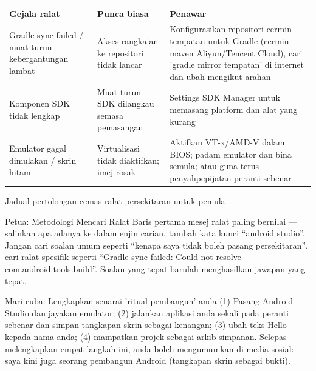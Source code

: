 \begin{center}
\begin{tabularx}{\linewidth}{|X|X|X|}
\hline
\textbf{Gejala ralat} & \textbf{Punca biasa} & \textbf{Penawar} \tabularnewline
\hline
Gradle sync failed / muat turun kebergantungan lambat & Akses rangkaian ke repositori tidak lancar & Konfigurasikan repositori cermin tempatan untuk Gradle (cermin maven Aliyun/Tencent Cloud), cari 'gradle mirror tempatan' di internet dan ubah mengikut arahan \tabularnewline
Komponen SDK tidak lengkap & Muat turun SDK dilangkau semasa pemasangan & Settings SDK Manager untuk memasang platform dan alat yang kurang \tabularnewline
Emulator gagal dimulakan / skrin hitam & Virtualisasi tidak diaktifkan; imej rosak & Aktifkan VT-x/AMD-V dalam BIOS; padam emulator dan bina semula; atau guna terus penyahpepijatan peranti sebenar \tabularnewline
\hline
\end{tabularx}
\end{center}

\begin{center}\small\color{gray}Jadual pertolongan cemas ralat persekitaran untuk pemula\end{center}

\begin{tcbinfo}{Petua: Metodologi Mencari Ralat}
Baris pertama mesej ralat paling bernilai — salinkan apa adanya ke dalam enjin carian, tambah kata kunci “android studio”. Jangan cari soalan umum seperti “kenapa saya tidak boleh pasang persekitaran”, cari ralat spesifik seperti “Gradle sync failed: Could not resolve com.android.tools.build”. Soalan yang tepat barulah menghasilkan jawapan yang tepat.

\end{tcbinfo}

\begin{tcbpractice}{Mari cuba: Lengkapkan senarai 'ritual pembangun' anda}
(1) Pasang Android Studio dan jayakan emulator; (2) jalankan aplikasi anda sekali pada peranti sebenar dan simpan tangkapan skrin sebagai kenangan; (3) ubah teks Hello kepada nama anda; (4) mampatkan projek sebagai arkib simpanan. Selepas melengkapkan empat langkah ini, anda boleh mengumumkan di media sosial: saya kini juga seorang pembangun Android (tangkapan skrin sebagai bukti).

\end{tcbpractice}

